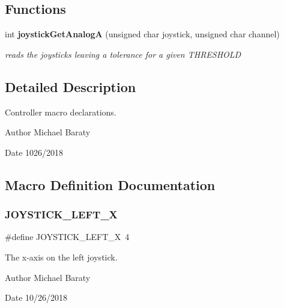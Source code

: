 \subsection*{Functions}
\begin{DoxyCompactItemize}
\item 
int \textbf{ joystick\+Get\+AnalogA} (unsigned char joystick, unsigned char channel)
\begin{DoxyCompactList}\small\item\em reads the joysticks leaving a tolerance for a given T\+H\+R\+E\+S\+H\+O\+LD \end{DoxyCompactList}\end{DoxyCompactItemize}


\subsection{Detailed Description}
Controller macro declarations. 

\begin{DoxyAuthor}{Author}
Michael Baraty 
\end{DoxyAuthor}
\begin{DoxyDate}{Date}
1026/2018 
\end{DoxyDate}


\subsection{Macro Definition Documentation}
\mbox{\label{controller_8h_a20c53ff73325230502157f3bab8c6f6e}} 
\subsubsection{J\+O\+Y\+S\+T\+I\+C\+K\+\_\+\+L\+E\+F\+T\+\_\+X}
{\footnotesize\ttfamily \#define J\+O\+Y\+S\+T\+I\+C\+K\+\_\+\+L\+E\+F\+T\+\_\+X~4}



The x-\/axis on the left joystick. 

\begin{DoxyAuthor}{Author}
Michael Baraty 
\end{DoxyAuthor}
\begin{DoxyDate}{Date}
10/26/2018 
\end{DoxyDate}


